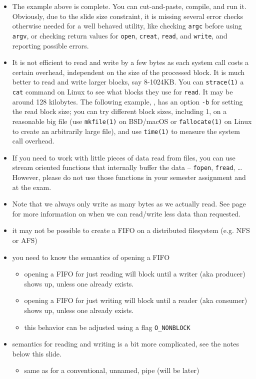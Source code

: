 \begin{itemize}
\item The example above is complete.  You can cut-and-paste, compile, and run
it.  Obviously, due to the slide size constraint, it is missing several error
checks otherwise needed for a well behaved utility, like checking \texttt{argc}
before using \texttt{argv}, or checking return values for \texttt{open},
\texttt{creat}, \texttt{read}, and \texttt{write}, and reporting possible
errors.
\item It is not efficient to read and write by a few bytes as each system call
costs a certain overhead, independent on the size of the processed block.  It is
much better to read and write larger blocks, say 8-1024KB.  You can
\texttt{strace(1)} a \texttt{cat} command on Linux to see what blocks they use
for \texttt{read}.  It may be around 128 kilobytes.  The following example,
, has an option \texttt{-b} for setting the read block size;
you can try different block sizes, including 1, on a reasonable big file (use
\texttt{mkfile(1)} on BSD/macOS or \texttt{fallocate(1)} on Linux to create an
arbitrarily large file), and use \texttt{time(1)} to measure the system call
overhead.
\item If you need to work with little pieces of data read from files, you can
use stream oriented functions that internally buffer the data -- \texttt{fopen},
\texttt{fread}, \dots  However, please do not use those functions in your
semester assignment and at the exam.
\item Note that we always only write as many bytes as we actually read.  See
page \pageref{READCALL} for more information on when we can read/write less data
than requested.
\end{itemize}

\begin{slide}

\begin{itemize}
\item it may not be possible to create a FIFO on a distributed filesystem (e.g.
NFS or AFS)
\item you need to know the semantics of opening a FIFO
  \begin{itemize}
  \item opening a FIFO for just reading will block until a writer (aka producer)
  shows up, unless one already exists.
  \item opening a FIFO for just writing will block until a reader (aka consumer)
  shows up, unless one already exists.
  \item this behavior can be adjusted using a flag \texttt{O\_NONBLOCK}
  \end{itemize}
\item semantics for reading and writing is a bit more complicated, see
the notes below this slide.
  \begin{itemize}
  \item same as for a conventional, unnamed, pipe (will be later)
  \end{itemize}
\end{itemize}
\end{slide}

